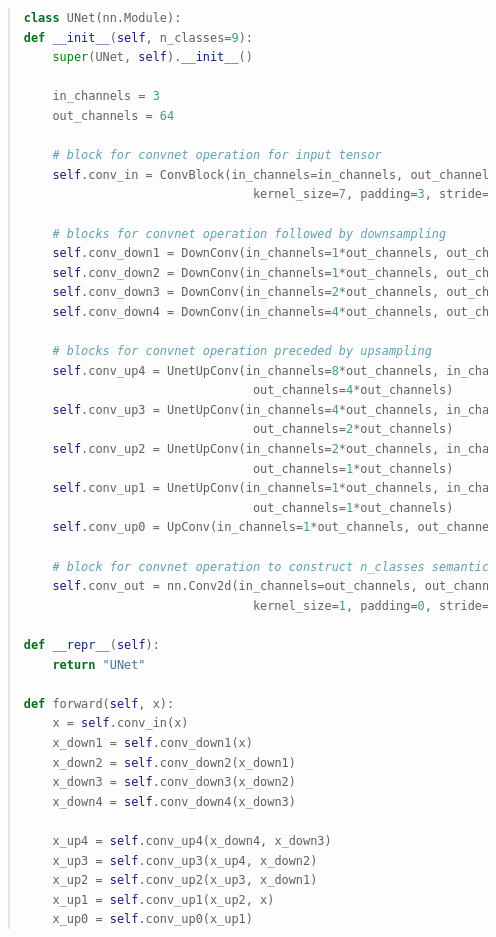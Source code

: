 \documentclass[9pt]{article}
\begin{document}
\begin{quote}
\begin{lstlisting}[language=Python, basicstyle=\scriptsize]
class UNet(nn.Module):
def __init__(self, n_classes=9):
    super(UNet, self).__init__()

    in_channels = 3
    out_channels = 64

    # block for convnet operation for input tensor
    self.conv_in = ConvBlock(in_channels=in_channels, out_channels=out_channels, 
                                kernel_size=7, padding=3, stride=2)

    # blocks for convnet operation followed by downsampling
    self.conv_down1 = DownConv(in_channels=1*out_channels, out_channels=1*out_channels)
    self.conv_down2 = DownConv(in_channels=1*out_channels, out_channels=2*out_channels)
    self.conv_down3 = DownConv(in_channels=2*out_channels, out_channels=4*out_channels)
    self.conv_down4 = DownConv(in_channels=4*out_channels, out_channels=8*out_channels)

    # blocks for convnet operation preceded by upsampling
    self.conv_up4 = UnetUpConv(in_channels=8*out_channels, in_channels_skip=4*out_channels, 
                                out_channels=4*out_channels)
    self.conv_up3 = UnetUpConv(in_channels=4*out_channels, in_channels_skip=2*out_channels, 
                                out_channels=2*out_channels)
    self.conv_up2 = UnetUpConv(in_channels=2*out_channels, in_channels_skip=1*out_channels, 
                                out_channels=1*out_channels)
    self.conv_up1 = UnetUpConv(in_channels=1*out_channels, in_channels_skip=1*out_channels, 
                                out_channels=1*out_channels)
    self.conv_up0 = UpConv(in_channels=1*out_channels, out_channels=1*out_channels)
    
    # block for convnet operation to construct n_classes semantic outputs
    self.conv_out = nn.Conv2d(in_channels=out_channels, out_channels=n_classes, 
                                kernel_size=1, padding=0, stride=1)

def __repr__(self):
    return "UNet"        

def forward(self, x):
    x = self.conv_in(x)
    x_down1 = self.conv_down1(x)
    x_down2 = self.conv_down2(x_down1)
    x_down3 = self.conv_down3(x_down2)
    x_down4 = self.conv_down4(x_down3)

    x_up4 = self.conv_up4(x_down4, x_down3)
    x_up3 = self.conv_up3(x_up4, x_down2)
    x_up2 = self.conv_up2(x_up3, x_down1)
    x_up1 = self.conv_up1(x_up2, x)
    x_up0 = self.conv_up0(x_up1)


\end{lstlisting}
\end{quote}
\end{document}
